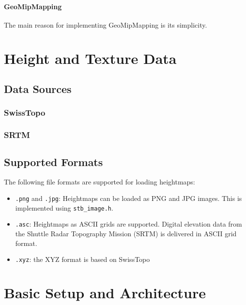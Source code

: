 \paragraph{GeoMipMapping} The main reason for implementing GeoMipMapping is its simplicity.


\section{Height and Texture Data}
\subsection{Data Sources}
\subsubsection{SwissTopo}

\subsubsection{SRTM}

\subsection{Supported Formats}
The following file formats are supported for loading heightmaps:
\begin{itemize}
  \item \texttt{.png} and \texttt{.jpg}: Heightmaps can be loaded as PNG and JPG images. This is implemented using \texttt{stb\_image.h}.
  \item \texttt{.asc}: Heightmaps as ASCII grids are supported. Digital elevation data from the Shuttle Radar Topography Mission (SRTM) is delivered in ASCII grid format.
  \item \texttt{.xyz}: the XYZ format is based on SwissTopo
\end{itemize}


\section{Basic Setup and Architecture}
